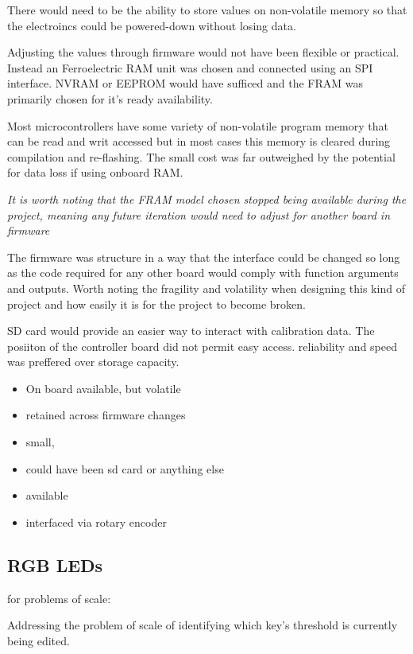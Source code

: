 There would need to be the ability to store values on non-volatile
memory so that the electroincs could be powered-down without losing
data.

Adjusting the values through firmware would not have been flexible or
practical. Instead an Ferroelectric RAM unit was chosen and connected
using an SPI interface. NVRAM or EEPROM would have sufficed and the FRAM
was primarily chosen for it's ready availability.

Most microcontrollers have some variety of non-volatile program memory
that can be read and writ accessed but in most cases this memory is
cleared during compilation and re-flashing. The small cost was far
outweighed by the potential for data loss if using onboard RAM.

\emph{It is worth noting that the FRAM model chosen stopped being
available during the project, meaning any future iteration would need to
adjust for another board in firmware}

The firmware was structure in a way that the interface could be changed
so long as the code required for any other board would comply with
function arguments and outputs. Worth noting the fragility and
volatility when designing this kind of project and how easily it is for
the project to become broken.

SD card would provide an easier way to interact with calibration data.
The posiiton of the controller board did not permit easy access.
reliability and speed was preffered over storage capacity.

\begin{itemize}
\item
  On board available, but volatile
\item
  retained across firmware changes
\item
  small,
\item
  could have been sd card or anything else
\item
  available
\item
  interfaced via rotary encoder
\end{itemize}

\subsection{RGB LEDs}\label{rgb-leds}

for problems of scale:

Addressing the problem of scale of identifying which key's threshold is
currently being edited.

